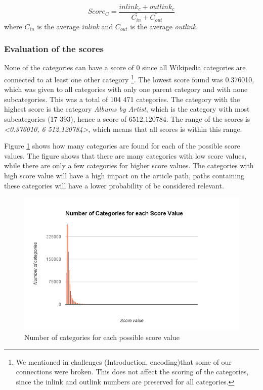 \begin{equation} \label{eq:scoreinout}
Score_{C} = \frac{inlink_{c} + outlink_{c}}{\bar{C_{in}} + \bar{C_{out}}}
\end{equation}
where $\bar{C_{in}}$ is the average \emph{inlink} and $\bar{C_{out}}$ is the average \emph{outlink}.


\subsubsection{Evaluation of the scores}
None of the categories can have a score of 0 since all Wikipedia categories are connected to at least one other category \footnote{We mentioned in challenges (Introduction, encoding)that some of our connections were broken. This does not affect the scoring of the categories, since the inlink and outlink numbers are preserved for all categories. }. The lowest score found was 0.376010, which was given to all categories with only one parent category and with none subcategories. This was a total of 104 471 categories.  The category with the highest score is the category \emph{Albums by Artist}, which is the category with most subcategories (17 393), hence a score of $6 512.120784$. The range of the scores is \emph{<0.376010, 6 512.120784>}, which means that all scores is within this range. 

Figure \ref{fig:scorevalue} shows how many categories are found for each of the possible score values. The figure shows that there are many categories with low score values, while there are only a few categories for higher score values. The categories with high score value will have a high impact on the article path, paths containing these categories will have a lower probability of be considered relevant. 


\begin{figure}[h]
\centering
\includegraphics[width=\textwidth]{Chapters/Implementation/Grading/Inlinkoutlink_scorevalue_numberofcategories}
\caption{Number of categories for each possible score value}
\label{fig:scorevalue}
\end{figure}



